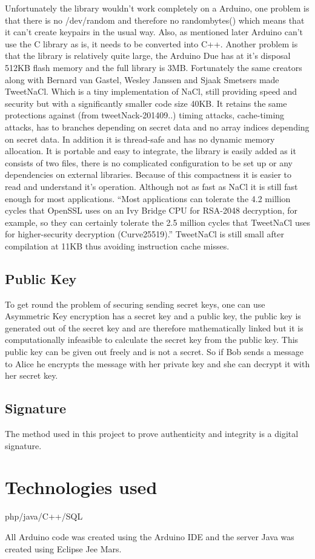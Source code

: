Unfortunately the library wouldn't work completely on a Arduino, one problem is that there is no /dev/random and therefore no randombytes() which means that it can't create keypairs in the usual way.
Also, as mentioned later Arduino can't use the C library as is, it needs to be converted into C++. 
Another problem is that the library is relatively quite large, the Arduino Due has at it's disposal 512KB flash memory and the full library is 3MB. Fortunately the same creators along with Bernard van Gastel, Wesley Janssen and Sjaak Smetsers made TweetNaCl. Which is a tiny implementation of NaCl, still providing speed and security but with a significantly smaller code size 40KB. It retains the same protections against (from tweetNack-201409..) timing attacks, cache-timing attacks, has to branches depending on secret data and no array indices depending on secret data. In addition it is thread-safe and has no dynamic memory allocation. It is portable and easy to integrate, the library is easily added as it consists of two files, there is no complicated configuration to be set up or any dependencies on external libraries. Because of this compactness it is easier to read and understand it's operation. Although not as fast as NaCl it is still fast enough for most applications. ``Most applications can tolerate the 4.2 million cycles that OpenSSL uses
on an Ivy Bridge CPU for RSA-2048 decryption, for example, so they can certainly tolerate
the 2.5 million cycles that TweetNaCl uses for higher-security decryption (Curve25519).''
TweetNaCl is still small after compilation at 11KB thus avoiding instruction cache misses. 


\subsection{Public Key}

To get round the problem of securing sending secret keys, one can use Asymmetric Key encryption has a secret key and a public key, the public key is generated out of the secret key and are therefore mathematically linked but it is computationally infeasible to calculate the secret key from the public key. This public key can be given out freely and is not a secret. So if Bob sends a message to Alice he encrypts the message with her private key and she can decrypt it with her secret key.


\subsection{Signature}

The method used in this project to prove authenticity and integrity is a digital signature. 



\section{Technologies used}

php/java/C++/SQL


All Arduino code was created using the Arduino IDE and the server Java was created using Eclipse Jee Mars.